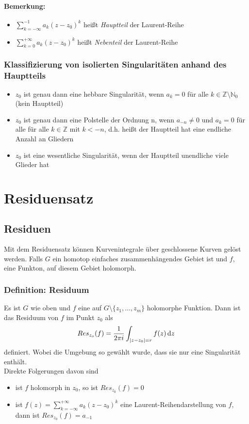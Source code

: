 \paragraph{Bemerkung:}
\begin{itemize}
    \item $\sum_{k=-\infty}^{-1}a_k(z-z_0)^k$ heißt \textit{Hauptteil} der Laurent-Reihe
    \item $\sum_{k=0}^{+\infty}a_k(z-z_0)^k$ heißt \textit{Nebenteil} der Laurent-Reihe
\end{itemize}

\subsubsection{Klassifizierung von isolierten Singularitäten anhand des Hauptteils}
\begin{itemize}
    \item $z_0$ ist genau dann eine hebbare Singularität, wenn $a_k=0$ für alle $k\in\mathbb{Z}\setminus\mathbb{N}_0$ (kein Hauptteil)
    \item $z_0$ ist genau dann eine Polstelle der Ordnung n, wenn $a_{-n}\neq 0 $ und $a_k=0$ für alle für alle $k\in\mathbb{Z}$ mit $k<-n$, d.h. heißt der Hauptteil hat eine endliche Anzahl an Gliedern
    \item $z_0$ ist eine wesentliche Singularität, wenn der Hauptteil unendliche viele Glieder hat
\end{itemize}

\section{Residuensatz}
\subsection{Residuen}
Mit dem Residuensatz können Kurvenintegrale über geschlossene Kurven gelöst werden. Falls $G$ ein homotop einfaches zusammenhängendes Gebiet ist und $f$, eine Funkton, auf diesem Gebiet holomorph.

\subsubsection{Definition: Residuum}
Es ist $G$ wie oben und $f$ eine auf $G\setminus\{z_1,\dots,z_m\}$ holomorphe Funktion. Dann ist das Residuum von $f$ im Punkt $z_0$ als
\begin{equation*}
    Res_{z_o}(f)= \frac{1}{2\pi i}\int_{|z-z_0|=r}f(z)\mathop{}\!\mathrm{d} z    
\end{equation*}
definiert. Wobei die Umgebung so gewählt wurde, dass sie nur eine Singularität enthält.\\
\noindent Direkte Folgerungen davon sind
\begin{itemize}
    \item ist $f$ holomorph in $z_0$, so ist $Res_{z_0}(f)=0$
    \item ist $f(z)=\sum_{k=-\infty}^{+\infty}a_k (z-z_0)^k$ eine Laurent-Reihendarstellung von $f$, dann ist $Res_{z_0}(f) = a_{-1}$
\end{itemize}

